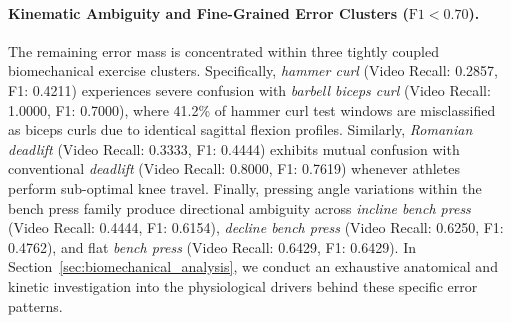 \documentclass[runningheads]{llncs}
\begin{document}
\paragraph{Kinematic Ambiguity and Fine-Grained Error Clusters ($\text{F1} < 0.70$).} The remaining error mass is concentrated within three tightly coupled biomechanical exercise clusters. Specifically, \textit{hammer curl} (Video Recall: 0.2857, F1: 0.4211) experiences severe confusion with \textit{barbell biceps curl} (Video Recall: 1.0000, F1: 0.7000), where 41.2\% of hammer curl test windows are misclassified as biceps curls due to identical sagittal flexion profiles. Similarly, \textit{Romanian deadlift} (Video Recall: 0.3333, F1: 0.4444) exhibits mutual confusion with conventional \textit{deadlift} (Video Recall: 0.8000, F1: 0.7619) whenever athletes perform sub-optimal knee travel. Finally, pressing angle variations within the bench press family produce directional ambiguity across \textit{incline bench press} (Video Recall: 0.4444, F1: 0.6154), \textit{decline bench press} (Video Recall: 0.6250, F1: 0.4762), and flat \textit{bench press} (Video Recall: 0.6429, F1: 0.6429). In Section~\ref{sec:biomechanical_analysis}, we conduct an exhaustive anatomical and kinetic investigation into the physiological drivers behind these specific error patterns.
\end{document}
